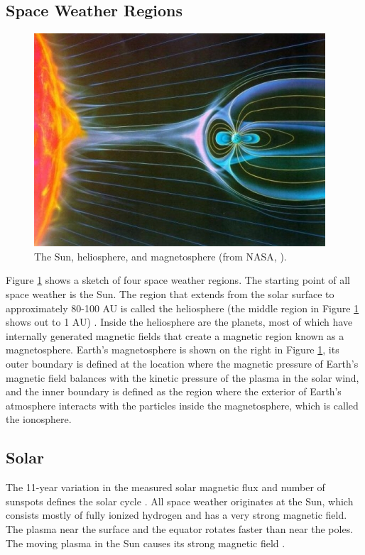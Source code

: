 \subsection{Space Weather Regions}
\begin{figure}
	\centering
	\includegraphics[scale=0.5]{images/NASA_BigPicture.jpg}
	\caption{The Sun, heliosphere, and magnetosphere (from NASA,
	\citeyear{SunHelMag}).}
    \label{fig:NASABP}
	\figSpace
\end{figure}
Figure \ref{fig:NASABP} shows a sketch of four space weather regions. The
starting point of all space weather is the Sun. The region that extends from the
solar surface to approximately 80-100 AU is called the heliosphere (the middle
region in Figure \ref{fig:NASABP} shows out to 1 AU)
\citep{Mewaldt1995}.
Inside the heliosphere are the planets, most of which have internally generated
magnetic fields that create a magnetic region known as a magnetosphere. Earth's
magnetosphere is shown on the right in Figure \ref{fig:NASABP}, its outer
boundary is defined at the location where the magnetic pressure of Earth's magnetic field
balances with the kinetic pressure of the plasma in the solar wind, and the
inner boundary is defined as the region where the exterior of Earth's
atmosphere interacts with the particles inside the magnetosphere, which is
called the ionosphere.

\subsection{Solar}
The 11-year variation in the measured solar magnetic flux and number of sunspots
defines the solar cycle \citep{Kallenrode}. All space weather originates at the
Sun, which consists mostly of fully ionized hydrogen and has a very strong magnetic field. The plasma near the
surface and the equator rotates faster than near the poles. The moving
plasma in the Sun causes its strong magnetic field \citep{Kulsrud}.

